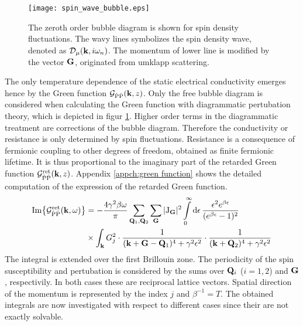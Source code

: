 %
\begin{figure}
	\centering
	\texttt{[image: spin\_wave\_bubble.eps]}
	\caption{
The zeroth order bubble diagram is shown for spin density fluctuations.
The wavy lines symbolizes the spin density wave, denoted as $\mathcal{D}_{\mu}(\vb{k},i\omega_{n})$.
The momentum of lower line is modified by the vector $\vb{G}$, originated from umklapp scattering.
	}
	\label{fig:spin wave bubble}
\end{figure}
%
The only temperature dependence of the static electrical conductivity emerges hence by the Green function $\mathcal{G}_{\dot{\mathrm{P}}\dot{\mathrm{P}}}(\vb{k}, z)$.
Only the free bubble diagram is considered when calculating the Green function with diagrammatic pertubation theory, which is depicted in figur \ref{fig:spin wave bubble}.
Higher order terms in the diagrammatic treatment are corrections of the bubble diagram.
Therefore the conductivity or resistance is only determined by spin fluctuations.
Resistance is a consequence of fermionic coupling to other degrees of freedom, obtained as finite fermionic lifetime.
It is thus proportional to the imaginary part of the retarded Green function $\mathcal{G}_{\dot{\mathrm{P}}\dot{\mathrm{P}}}^{\mathrm{ret}}(\vb{k}, z)$.
Appendix \ref{appch:green function} shows the detailed computation of the expression of the retarded Green function.
%
\begin{align}
	\Im{\mathcal{G}_{\dot{\mathrm{P}}\dot{\mathrm{P}}}^{\mathrm{ret}}(\vb{k}, \omega)} &= 
		-\frac{4 \gamma^{2} \beta \omega}{\pi}
		\sum\limits_{\vb{Q}_{1}, \vb{Q}_{2}}
		\sum\limits_{\vb{G}}
		\vert \mathrm{J}_{\vb{G}} \vert^{2}
		\int\limits_{0}^{\infty} \dd{\epsilon}
		\frac{\epsilon^{2} e^{\beta \epsilon}}{(e^{\beta \epsilon} - 1)^{2}}
		\notag \\
		&\times
		\int_{\vb{k}} G_{j}^{2} \cdot
		\frac{1}{(\vb{k}+\vb{G}-\vb{Q}_{1})^{4} + \gamma^{2} \epsilon^{2}} \cdot
		\frac{1}{(\vb{k} + \vb{Q}_{2})^{4} + \gamma^{2} \epsilon^{2}}
\end{align}
%
The integral is extended over the first Brillouin zone.
The periodicity of the spin susceptibility and pertubation is considered by the sums over $\vb{Q}_{i}$ ($i=1,2$) and $\vb{G}$, respectivily.
In both cases these are reciprocal lattice vectors.
Spatial direction of the momentum is represented by the index $j$ and $\beta^{-1} = T$.
The obtained integrals are now investigated with respect to different cases since their are not exactly solvable.
%
%
%
%

